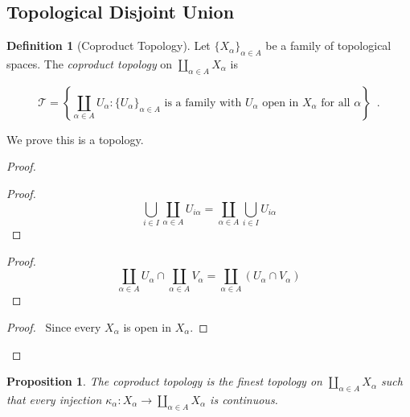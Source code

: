 \documentclass{book}
\let\qed\relax
\newtheorem{prop}[ax]{Proposition}
\theoremstyle{definition}
\newtheorem{df}[ax]{Definition}
\begin{document}
\subsection{Topological Disjoint Union}

\begin{df}[Coproduct Topology]
Let $\{ X_\alpha \}_{\alpha \in A}$ be a family of topological spaces. The \emph{coproduct topology} on $\coprod_{\alpha \in A} X_\alpha$ is 

\[ \mathcal{T} = \left\{ \coprod_{\alpha \in A} U_\alpha : \{ U_\alpha \}_{\alpha \in A} \text{ is a family with $U_\alpha$ open in $X_\alpha$ for all $\alpha$} \right\} \enspace . \]

We prove this is a topology.
\end{df}

\begin{proof}
\pf
{}
\begin{proof}
	\pf
	\[ \bigcup_{i \in I} \coprod_{\alpha \in A} U_{i\alpha} = \coprod_{\alpha \in A} \bigcup_{i \in I} U_{i \alpha} \]
\end{proof}
\begin{proof}
	\pf
	\[ \coprod_{\alpha \in A} U_\alpha \cap \coprod_{\alpha \in A} V_\alpha = \coprod_{\alpha \in A} (U_\alpha \cap V_\alpha) \]
\end{proof}
\begin{proof}
	\pf\ Since every $X_\alpha$ is open in $X_\alpha$.
\end{proof}
\qed
\end{proof}

\begin{prop}
\label{prop:coproduct_finest}
The coproduct topology is the finest topology on $\coprod_{\alpha \in A} X_\alpha$ such that every injection $\kappa_\alpha : X_\alpha \rightarrow \coprod_{\alpha \in A} X_\alpha$ is continuous.
\end{prop}
\end{document}
